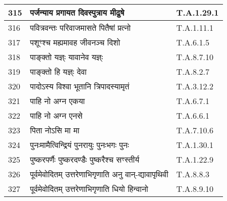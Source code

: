 \documentclass[17pt]{extarticle}
\begin{document}
\begin{longtable}{||p{0.4in}||p{4.9in}||p{0.9in}||}
    \hline
        
    315 & पर्जन्याय प्रगायत दिवस्पुत्राय मीढुषे & T.A.1.29.1       \\
    
    \hline
        
    316 & पवित्रवन्तः परिवाजमासते पितैषां प्रत्नो & T.A.1.11.1       \\
    
    \hline
        
    317 & पशूꣳश्च मह्यमावह जीवनञ्च दिशो & T.A.6.1.5       \\
    
    \hline
        
    318 & पाङ्क्तो यज्ञ्ः यावानेव यज्ञ्ः & T.A.8.7.10       \\
    
    \hline
        
    319 & पाङ्क्तो हि यज्ञ्ः देवा & T.A.8.2.7       \\
    
    \hline
        
    320 & पादोऽस्य विश्वा भूतानि त्रिपादस्यामृतं & T.A.3.12.2       \\
    
    \hline
        
    321 & पाहि नो अग्न एकया & T.A.6.7.1       \\
    
    \hline
        
    322 & पाहि नो अग्न एनसे & T.A.6.6.1       \\
    
    \hline
        
    323 & पिता नोऽसि मा मा & T.A.7.10.6       \\
    
    \hline
        
    324 & पुनःमामैत्विन्द्रियं पुनरायुः पुनःभगः पुनः & T.A.1.30.1       \\
    
    \hline
        
    325 & पुष्करपर्णैः पुष्करदण्डैः पुष्करैश्च सꣳस्तीर्य & T.A.1.22.9       \\
    
    \hline
        
    326 & पूर्वमेवोदितम् उत्तरेणाभिगृणाति अनु वान्{-}द्यावापृथिवी & T.A.8.8.3       \\
    
    \hline
        
    327 & पूर्वमेवोदितम् उत्तरेणाभिगृणाति धियो हिन्वानो & T.A.8.9.10       \\
    

\end{longtable}
\end{document}
